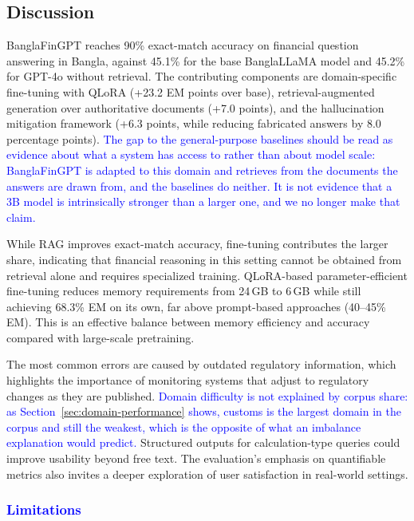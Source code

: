 \documentclass{article}
\newcommand{\revised}[1]{\textcolor{blue}{#1}}
\newcommand{\revised}[1]{#1}
\begin{document}
\subsection{Discussion}

BanglaFinGPT reaches 90\% exact-match accuracy on financial question answering in
Bangla, against 45.1\% for the base BanglaLLaMA model and 45.2\% for GPT-4o without
retrieval. The contributing components are domain-specific fine-tuning with QLoRA
(+23.2 EM points over base), retrieval-augmented generation over authoritative documents
(+7.0 points), and the hallucination mitigation framework (+6.3 points, while reducing
fabricated answers by 8.0 percentage points). \revised{The gap to the general-purpose baselines should be read as evidence about what
a system has access to rather than about model scale: BanglaFinGPT is adapted to this
domain and retrieves from the documents the answers are drawn from, and the baselines do
neither. It is not evidence that a 3B model is intrinsically stronger than a larger one,
and we no longer make that claim.}

While RAG improves exact-match accuracy, fine-tuning contributes the larger share,
indicating that financial reasoning in this setting cannot be obtained from retrieval
alone and requires specialized training. QLoRA-based parameter-efficient fine-tuning
reduces memory requirements from 24\,GB to 6\,GB while still achieving 68.3\% EM on its
own, far above prompt-based approaches (40--45\% EM). This is an effective balance
between memory efficiency and accuracy compared with large-scale pretraining.

The most common errors are caused by outdated regulatory information, which highlights
the importance of monitoring systems that adjust to regulatory changes as they are
published. \revised{Domain difficulty is not explained by corpus share: as
Section~\ref{sec:domain-performance} shows, customs is the largest domain in the corpus
and still the weakest, which is the opposite of what an imbalance explanation would
predict.} Structured outputs for
calculation-type queries could improve usability beyond free text. The evaluation's
emphasis on quantifiable metrics also invites a deeper exploration of user satisfaction
in real-world settings.

\subsubsection{\revised{Limitations}}
\label{sec:limitations}
\end{document}
